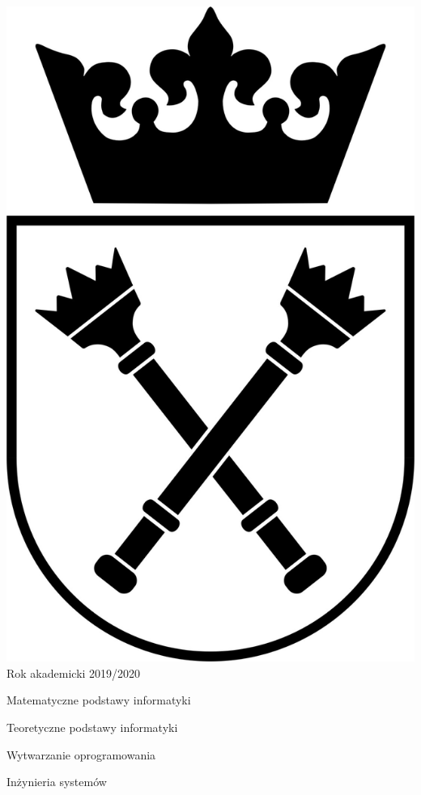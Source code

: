 \documentclass[12pt]{article}
\begin{document}
\begin{titlepage}
        \includegraphics[scale=0.27]{uj.jpg}\\[2cm]

        {\large Rok akademicki 2019/2020}\\

        \vfill
    \end{titlepage}

    \tableofcontents

    \newpage

    \begin{center}{\LARGE Matematyczne podstawy informatyki}\end{center}

    

    \begin{center} {\LARGE Teoretyczne podstawy informatyki} \end{center}

    

    \begin{center}{\LARGE Wytwarzanie oprogramowania}\end{center}

    

    \begin{center}{\LARGE Inżynieria systemów}\end{center}

    
\end{document}
